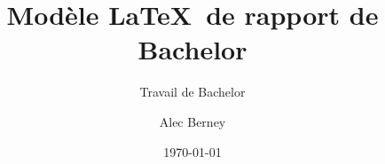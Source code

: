 \author{Alec Berney}


\title{Modèle \LaTeX~de rapport de Bachelor}

\subtitle{Travail de Bachelor}


\date{\today}



